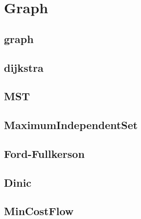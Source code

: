\section{Graph}

\subsection{graph}


\subsection{dijkstra}


\subsection{MST}


\subsection{MaximumIndependentSet}


\subsection{Ford-Fullkerson}


\subsection{Dinic}


\subsection{MinCostFlow}


